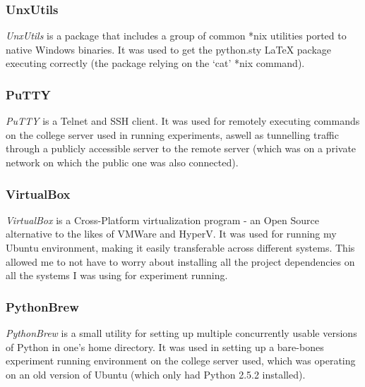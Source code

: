 \documentclass[a4paper,11pt]{report}
\begin{document}
\subsubsection*{UnxUtils}
\emph{UnxUtils} \citep{prog:unxutils} is a package that includes a group of common *nix utilities ported to native Windows binaries. It was used to get the python.sty \LaTeX{} package executing correctly (the package relying on the `cat' *nix command).

\subsubsection*{PuTTY}
\emph{PuTTY} \citep{prog:putty} is a Telnet and SSH client. It was used for remotely executing commands on the college server used in running experiments, aswell as tunnelling traffic through a publicly accessible server to the remote server (which was on a private network on which the public one was also connected).

\subsubsection*{VirtualBox}
\emph{VirtualBox} \citep{prog:virtualbox} is a Cross-Platform virtualization program - an Open Source alternative to the likes of VMWare and HyperV. It was used for running my Ubuntu environment, making it easily transferable across different systems. This allowed me to not have to worry about installing all the project dependencies on all the systems I was using for experiment running.

\subsubsection*{PythonBrew}
\emph{PythonBrew} \citep{prog:pythonbrew} is a small utility for setting up multiple concurrently usable versions of Python in one's home directory. It was used in setting up a bare-bones experiment running environment on the college server used, which was operating on an old version of Ubuntu (which only had Python 2.5.2 installed).



\end{document}
